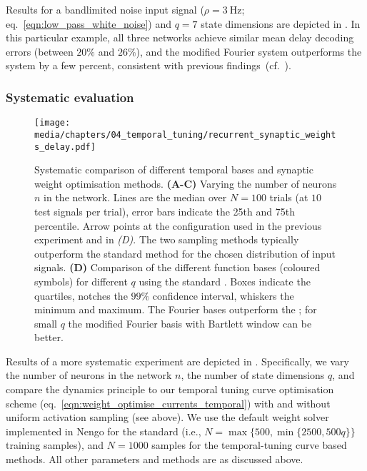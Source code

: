 Results for a bandlimited noise input signal ($\rho = \SI{3}{\hertz}$; eq.~\ref{eqn:low_pass_white_noise}) and $q = 7$ state dimensions are depicted in .
In this particular example, all three networks achieve similar mean delay decoding errors (\NRMSEpl between $20\%$ and $26\%$), and the modified Fourier system outperforms the \LDN system by a few percent, consistent with previous findings~(cf.~).

\subsubsection{Systematic evaluation}

\begin{figure}[p]
	\centering
	\texttt{[image: media/chapters/04\_temporal\_tuning/recurrent\_synaptic\_weights\_delay.pdf]}
	\caption[Systematic comparison of different temporal bases and synaptic weight optimisation methods]{
	Systematic comparison of different temporal bases and synaptic weight optimisation methods.
	\textbf{(A-C)} Varying the number of neurons $n$ in the network. Lines are the median over $N = 100$ trials (at $10$ test signals per trial), error bars indicate the 25th and 75th percentile. Arrow points at the configuration used in the previous experiment and in \emph{(D)}. The two sampling methods typically outperform the standard \NEF method for the chosen distribution of input signals.
	\textbf{(D)} Comparison of the different function bases (coloured symbols) for different $q$ using the standard \NEF.
	Boxes indicate the quartiles, notches the $99\%$ confidence interval, whiskers the minimum and maximum.
	The Fourier bases outperform the \LDN; for small $q$ the modified Fourier basis with Bartlett window can be better.
	}
	\label{fig:recurrent_synaptic_weights_delay}
\end{figure}

Results of a more systematic experiment are depicted in .
Specifically, we vary the number of neurons in the network $n$, the number of state dimensions $q$, and compare the \NEF dynamics principle to our temporal tuning curve optimisation scheme (eq.~\ref{eqn:weight_optimise_currents_temporal}) with and without uniform activation sampling (see above).
We use the default weight solver implemented in Nengo for the standard \NEF (i.e., $N = \max\{500, \min\{2500, 500 q\}\}$ training samples), and $N = 1000$ samples for the temporal-tuning curve based methods.
All other parameters and methods are as discussed above.

